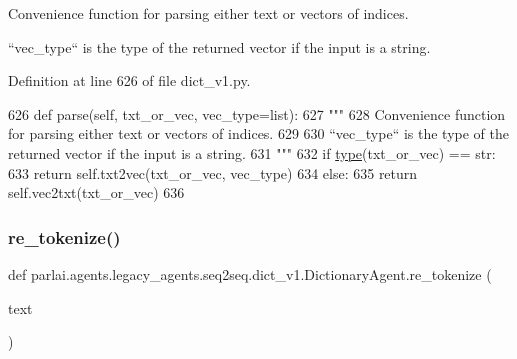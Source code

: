 \begin{DoxyVerb}Convenience function for parsing either text or vectors of indices.

``vec_type`` is the type of the returned vector if the input is a string.
\end{DoxyVerb}
 

Definition at line 626 of file dict\+\_\+v1.\+py.


\begin{DoxyCode}
626     \textcolor{keyword}{def }parse(self, txt\_or\_vec, vec\_type=list):
627         \textcolor{stringliteral}{"""}
628 \textcolor{stringliteral}{        Convenience function for parsing either text or vectors of indices.}
629 \textcolor{stringliteral}{}
630 \textcolor{stringliteral}{        ``vec\_type`` is the type of the returned vector if the input is a string.}
631 \textcolor{stringliteral}{        """}
632         \textcolor{keywordflow}{if} \hyperlink{namespaceparlai_1_1agents_1_1tfidf__retriever_1_1build__tfidf_ad5dfae268e23f506da084a9efb72f619}{type}(txt\_or\_vec) == str:
633             \textcolor{keywordflow}{return} self.txt2vec(txt\_or\_vec, vec\_type)
634         \textcolor{keywordflow}{else}:
635             \textcolor{keywordflow}{return} self.vec2txt(txt\_or\_vec)
636 
\end{DoxyCode}
\mbox{\label{classparlai_1_1agents_1_1legacy__agents_1_1seq2seq_1_1dict__v1_1_1DictionaryAgent_abff9231bccd54f5222bef672dd978516}} 
\subsubsection{\texorpdfstring{re\+\_\+tokenize()}{re\_tokenize()}}
{\footnotesize\ttfamily def parlai.\+agents.\+legacy\+\_\+agents.\+seq2seq.\+dict\+\_\+v1.\+Dictionary\+Agent.\+re\+\_\+tokenize (\begin{DoxyParamCaption}\item[{}]{text }\end{DoxyParamCaption})\hspace{0.3cm}{\ttfamily [static]}}

